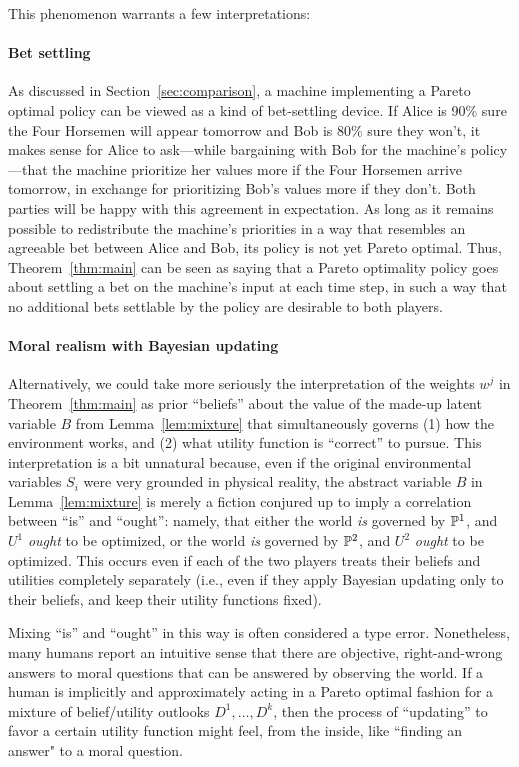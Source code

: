 \documentclass{article}  %
\newcommand{\bool}{B}
\newcommand{\lem}[1]{Lemma~\ref{lem:#1}}
\newcommand{\thm}[1]{Theorem~\ref{thm:#1}}
\newcommand{\sect}[1]{Section~\ref{sec:#1}}
\begin{document}
This phenomenon warrants a few interpretations:

\paragraph{Bet settling}

As discussed in \sect{comparison}, a machine implementing a Pareto optimal policy can be viewed as a kind of bet-settling device.  If Alice is 90\% sure the Four Horsemen will appear tomorrow and Bob is 80\% sure they won't, it makes sense for Alice to ask---while bargaining with Bob for the machine's policy---that the machine prioritize her values more if the Four Horsemen arrive tomorrow, in exchange for prioritizing Bob's values more if they don't.  Both parties will be happy with this agreement in expectation.  As long as it remains possible to redistribute the machine's priorities in a way that resembles an agreeable bet between Alice and Bob, its policy is not yet Pareto optimal.  Thus, \thm{main} can be seen as saying that a Pareto optimality policy goes about settling a bet on the machine's input at each time step, in such a way that no additional bets settlable by the policy are desirable to both players.

\paragraph{Moral realism with Bayesian updating}

Alternatively, we could take more seriously the interpretation of the weights $w^j$ in \thm{main} as prior ``beliefs'' about the value of the made-up latent variable $\bool $ from \lem{mixture} that simultaneously governs (1) how the environment works, and (2) what utility function is ``correct'' to pursue.  This interpretation is a bit unnatural because, even if the original environmental variables $S_i$ were very grounded in physical reality, the abstract variable $\bool $ in \lem{mixture} is merely a fiction conjured up to imply a correlation between ``is'' and ``ought'': namely, that either the world \emph{is} governed by $\mathbb{P}^1$, and $U^1$ \emph{ought} to be optimized, or the world \emph{is} governed by $\mathbb{P}^2$, and $U^2$ \emph{ought} to be optimized.  This occurs even if each of the two players treats their beliefs and utilities completely separately (i.e., even if they apply Bayesian updating only to their beliefs, and keep their utility functions fixed).

Mixing ``is'' and ``ought'' in this way is often considered a type error.  Nonetheless, many humans report an intuitive sense that there are objective, right-and-wrong answers to moral questions that can be answered by observing the world.  If a human is implicitly and approximately acting in a Pareto optimal fashion for a mixture of belief/utility outlooks $D^1, \ldots, D^k$, then the process of ``updating'' to favor a certain utility function might feel, from the inside, like ``finding an answer" to a moral question.
\end{document}
